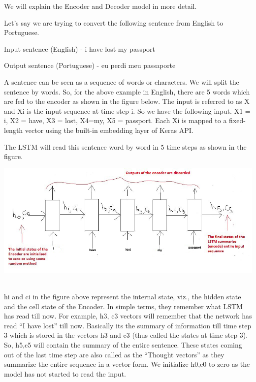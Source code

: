 \documentclass[runningheads]{llncs}
\begin{document}
	We will explain the  Encoder and Decoder model in more detail.  
	
	Let's say we are trying to convert the following sentence from English to Portuguese.

	Input sentence (English) - i have lost my passport
	
	Output sentence (Portuguese) - eu perdi meu passaporte
	
	A sentence can be seen as a sequence of words or characters. We will split the sentence by words. So, for the above example in English, there are 5 words which are fed to the encoder as shown in the figure below. The input is referred to as X and X{i} is the input sequence at time step i. So we have the following input.
	X{1} = i, X{2} = have, X{3} = lost,  X{4}=my, X{5} = passport.
	Each X{i} is mapped to a fixed-length vector using the built-in embedding layer of Keras API.
	
	The LSTM will read this sentence word by word in 5 time steps as shown in the figure.
	
	\begin{minipage}{\linewidth}
		\begin{center}
			\includegraphics[width=\linewidth]{EncoderLSTM.jpeg}
			\label{fig:Encoder LSTM}~\cite{ref_url5}
		\end{center}
	\end{minipage}
	\afterpage{\clearpage}
	
 	h{i} and c{i} in the figure above represent the internal state, viz., the hidden state and the cell state of the Encoder. In simple terms, they remember what LSTM has read till now. 
 	For example, 
 	h{3}, c{3} vectors will remember that the network has read “I have lost” till now. Basically its the summary of information till time step 3 which is stored in the vectors h3 and c3 (thus called the states at time step 3). So, h{5},c{5} will contain the summary of the entire sentence. These states coming out of the last time step are also called as the “Thought vectors” as they summarize the entire sequence in a vector form. We initialize h{0},c{0} to zero as the model has not started to read the input.
 	
\end{document}

